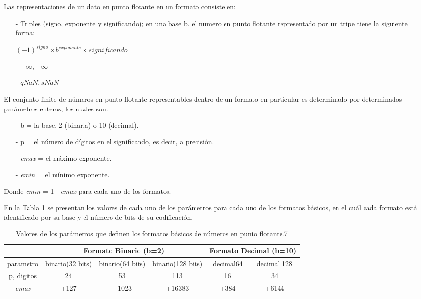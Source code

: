 Las representaciones de un dato en punto flotante en un formato consiste en:

\begin{itemize}
	\item[-]	Triples (signo, exponente y significando); en una base b, el numero en punto flotante representado por un tripe tiene la siguiente forma:
    \begin{center} $(-1)^{signo} \times b^{exponente} \times significando $ \end{center}
	\item[-]	$+\infty, -\infty $
	\item[-]	$qNaN, sNaN$
\end{itemize}

El conjunto finito de números en punto flotante representables dentro de un formato en particular es determinado por determinados parámetros enteros, los cuales son: 

\begin{itemize}
	\item[-]		b = la base, 2 (binaria) o 10 (decimal).
	\item[-]		p = el número de dígitos en el significando, es decir, a precisión.
	\item[-]		\textit{emax} = el máximo exponente.
	\item[-]		\textit{emin} = el mínimo exponente.
\end{itemize}

Donde \textit{emin} = 1 - \textit{emax} para cada uno de los formatos.

En la Tabla \ref{Tabla_Parametros}  se presentan los valores de cada uno de los parámetros para cada uno de los formatos básicos, en el cuál cada formato está identificado por su base y el número de bits de su codificación.

\begin{table}[H]
\centering
\caption{Valores de los parámetros que definen los formatos básicos de números en punto flotante.7}
\label{Tabla_Parametros}
\begin{tabular}{c|c|c|c|c|c|}
\cline{2-6}
                                    & \multicolumn{3}{c|}{Formato Binario (b=2)}              & \multicolumn{2}{c|}{Formato Decimal (b=10)} \\ \hline
\multicolumn{1}{|c|}{parametro}     & binario(32 bits) & binario(64 bits) & binario(128 bits) & decimal64           & decimal 128           \\ \hline
\multicolumn{1}{|c|}{p, digitos}    & 24               & 53               & 113               & 16                  & 34                    \\ \hline
\multicolumn{1}{|c|}{\textit{emax}} & +127             & +1023            & +16383            & +384                & +6144                 \\ \hline
\end{tabular}
\end{table}


